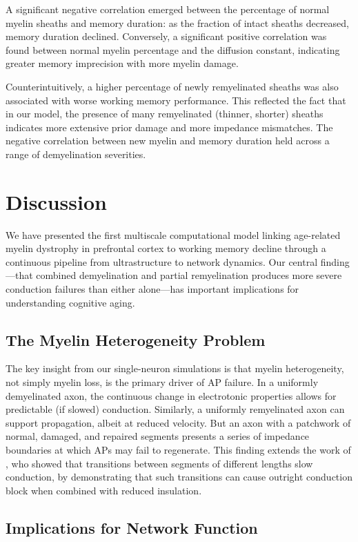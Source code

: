 \documentclass[11pt]{article}
\begin{document}
A significant negative correlation emerged between the percentage of normal myelin sheaths and memory duration: as the fraction of intact sheaths decreased, memory duration declined. Conversely, a significant positive correlation was found between normal myelin percentage and the diffusion constant, indicating greater memory imprecision with more myelin damage.

Counterintuitively, a higher percentage of newly remyelinated sheaths was also associated with worse working memory performance. This reflected the fact that in our model, the presence of many remyelinated (thinner, shorter) sheaths indicates more extensive prior damage and more impedance mismatches. The negative correlation between new myelin and memory duration held across a range of demyelination severities.

\section{Discussion}

We have presented the first multiscale computational model linking age-related myelin dystrophy in prefrontal cortex to working memory decline through a continuous pipeline from ultrastructure to network dynamics. Our central finding---that combined demyelination and partial remyelination produces more severe conduction failures than either alone---has important implications for understanding cognitive aging.

\subsection{The Myelin Heterogeneity Problem}

The key insight from our single-neuron simulations is that myelin heterogeneity, not simply myelin loss, is the primary driver of AP failure. In a uniformly demyelinated axon, the continuous change in electrotonic properties allows for predictable (if slowed) conduction. Similarly, a uniformly remyelinated axon can support propagation, albeit at reduced velocity. But an axon with a patchwork of normal, damaged, and repaired segments presents a series of impedance boundaries at which APs may fail to regenerate. This finding extends the work of \citet{scurfield2018}, who showed that transitions between segments of different lengths slow conduction, by demonstrating that such transitions can cause outright conduction block when combined with reduced insulation.

\subsection{Implications for Network Function}
\end{document}
